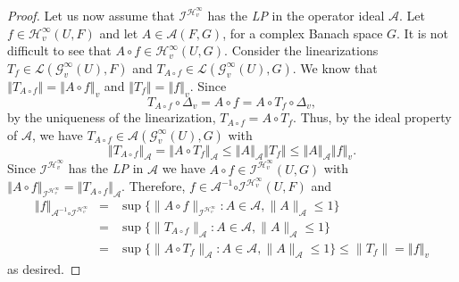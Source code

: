 \documentclass[10pt,a4paper]{amsart}
\begin{document}
\begin{proof}
Let us now assume that $\mathcal{I}^{\mathcal{H}_{v}^{\infty }}$ has the 
\textit{LP} in the operator ideal $\mathcal{A}$. Let $f\in \mathcal{H}%
_{v}^{\infty }\left( U,F\right) $ and let $A\in \mathcal{A}\left( F,G\right) 
$, for a complex Banach space $G$. It is not difficult to see that $A\circ
f\in \mathcal{H}_{v}^{\infty }\left( U,G\right) $. Consider the linearizations $T_f\in \mathcal{L}(\mathcal{G}_{v}^{\infty }(U),F)$ and $T_{A\circ
f}\in \mathcal{L}(\mathcal{G}_{v}^{\infty }(U),G)$. We know that  $\left\Vert
T_{A\circ f}\right\Vert =\left\Vert A\circ f\right\Vert _{v}$ and $\left\Vert T_{f}\right\Vert =\left\Vert f\right\Vert _{v}$. Since
\begin{equation*}
T_{A\circ f}\circ \Delta _{v}=A\circ f=A\circ T_{f}\circ \Delta _{v},
\end{equation*}
by the uniqueness of the linearization, $T_{A\circ f}=A\circ T_{f}$. Thus, by the ideal property of $\mathcal{A}$,
we have $T_{A\circ f}\in \mathcal{A}(\mathcal{G}_{v}^{\infty }(U),G)$ with%
\begin{equation*}
\left\Vert T_{A\circ f}\right\Vert _{\mathcal{A}}=\left\Vert A\circ
T_{f}\right\Vert _{\mathcal{A}}\leq \left\Vert A\right\Vert _{\mathcal{A}%
}\left\Vert T_{f}\right\Vert \leq \left\Vert A\right\Vert _{\mathcal{A}%
}\left\Vert f\right\Vert _{v}.
\end{equation*}%
Since $\mathcal{I}^{\mathcal{H}_{v}^{\infty }}$ has the \textit{LP} in $%
\mathcal{A}$  we have $A\circ f\in \mathcal{I}^{\mathcal{H}_{v}^{\infty }}\left(
U,G\right) $ with $\left\Vert A\circ f\right\Vert _{\mathcal{I}^{\mathcal{H}%
_{v}^{\infty }}}=\left\Vert T_{A\circ f}\right\Vert _{\mathcal{A}}$. Therefore,  $f\in 
\mathcal{A}^{-1}\mathcal{\circ I}^{\mathcal{H}_{v}^{\infty }}\left(
U,F\right) $ and 
\begin{eqnarray*}
\left\Vert f\right\Vert _{\mathcal{A}^{-1}\mathcal{\circ I%
}^{\mathcal{H}_{v}^{\infty }}}&=&\sup\{ \|A\circ f\|_{\mathcal I^{\mathcal H_v^\infty}} : A\in \mathcal A, \|A\|_{\mathcal A}\leq 1\}\\
&=&  \sup\{ \|T_{A\circ f}\|_{\mathcal A} : A\in \mathcal A, \|A\|_{\mathcal A}\leq 1\}\\
&=&\sup\{ \|A\circ T_f\|_{\mathcal A} : A\in \mathcal A, \|A\|_{\mathcal A}\leq 1\}\leq \|T_f\|= \left\Vert f\right\Vert _{v}
 \end{eqnarray*}
  as desired.
\end{proof}
\end{document}
